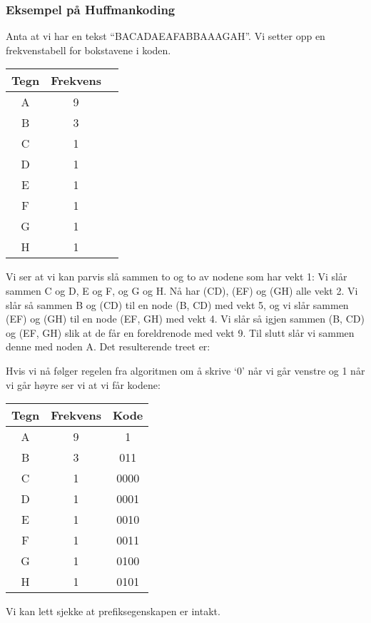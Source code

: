 		\subsubsection{Eksempel på Huffmankoding}
		Anta at vi har en tekst ``BACADAEAFABBAAAGAH''. Vi setter opp en frekvenstabell for bokstavene i koden.
			\begin{center}
				\begin{tabular}{c c c}
					Tegn & Frekvens \\
					\hline
					A & 9\\
					B & 3\\
					C & 1\\
					D & 1\\
					E & 1\\
					F & 1\\
					G & 1\\
					H & 1
				\end{tabular}
			\end{center}
			Vi ser at vi kan parvis slå sammen to og to av nodene som har vekt 1: Vi slår sammen C og D, E og F, og G og H. Nå har (CD), (EF) og (GH) alle vekt 2. Vi slår så sammen B og (CD) til en node (B, CD) med vekt 5, og vi slår sammen (EF) og (GH) til en node (EF, GH) med vekt 4. Vi slår så igjen sammen (B, CD) og (EF, GH) slik at de får en foreldrenode med vekt 9. Til slutt slår vi sammen denne med noden A. Det resulterende treet er:


			Hvis vi nå følger regelen fra algoritmen om å skrive `0' når vi går venstre og 1 når vi går høyre ser vi at vi får kodene:
			\begin{center}
				\begin{tabular}{c c c}
					Tegn & Frekvens & Kode \\
					\hline
					A & 9 & 1\\
					B & 3 & 011\\
					C & 1 & 0000\\
					D & 1 & 0001\\
					E & 1 & 0010\\
					F & 1 & 0011\\
					G & 1 & 0100\\
					H & 1 & 0101
				\end{tabular}
			\end{center}
			Vi kan lett sjekke at prefiksegenskapen er intakt.
